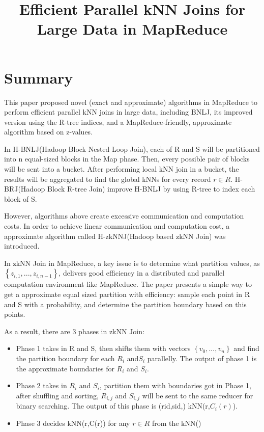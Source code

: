\documentclass[conference]{IEEEtran}
\begin{document}
	\title{Efficient Parallel kNN Joins for Large Data in MapReduce}	
	\maketitle
	\IEEEpeerreviewmaketitle	
	\section{Summary}
	This paper proposed novel (exact and approximate) algorithms in MapReduce to perform efficient parallel kNN joins in large data, including BNLJ, its improved version using the R-tree indices, and a MapReduce-friendly, approximate algorithm based on z-values.

	In H-BNLJ(Hadoop Block Nested Loop Join), each of R and S will be partitioned into n equal-sized blocks in the Map phase. Then, every possible pair of blocks will be sent into a bucket. After performing local kNN join in a bucket, the results will be aggregated to find the global kNNs for every record $r\in R$. H-BRJ(Hadoop Block R-tree Join) improve H-BNLJ by using R-tree to index each block of S.
	
	However, algorithms above create excessive communication and computation costs. In order to achieve linear communication and computation cost, a approximate algorithm called H-zkNNJ(Hadoop based zkNN Join) was introduced.
	
	In zkNN Join in MapReduce, a key issue is to determine what partition values, as $\left\lbrace z_{i,1},...,z_{i,n-1} \right\rbrace$, delivers good efficiency in a distributed and parallel computation environment like MapReduce. The paper presents a simple way to get a approximate equal sized partition with efficiency: sample each point in R and S with a probability, and determine the partition boundary based on this points. 
	
	As a result, there are 3 phases in zkNN Join: 
	\begin{itemize}
		\item Phase 1 takes in R and S, then shifts them with vectors $\left\lbrace v_0,...,v_n \right\rbrace$ and find the partition boundary for each $R_i$ and$ S_i$ parallelly. The output of phase 1 is the approximate boundaries for $R_i$ and $S_i$.
		\item Phase 2 takes in $R_i$ and $S_i$, partition them with boundaries got in Phase 1, after shuffling and sorting, $R_{i,j}$ and $S_{i,j}$ will be sent to the same reducer for binary searching. The output of this phase is (rid,sid,) kNN(r,$C_i(r)$).
		\item Phase 3 decides kNN(r,C(r)) for any $r\in R$ from the kNN()
	\end{itemize}
\end{document}
